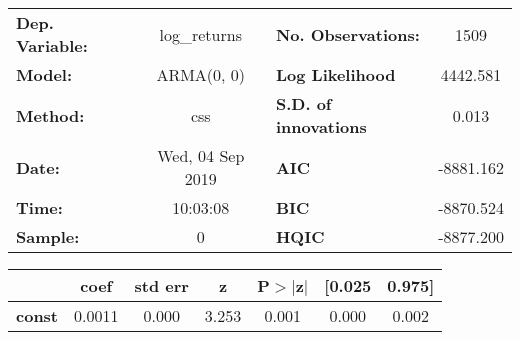\begin{center}
\begin{tabular}{lclc}
\toprule
\textbf{Dep. Variable:} &   log\_returns   & \textbf{  No. Observations:  } &    1509     \\
\textbf{Model:}         &    ARMA(0, 0)    & \textbf{  Log Likelihood     } &  4442.581   \\
\textbf{Method:}        &       css        & \textbf{  S.D. of innovations} &   0.013     \\
\textbf{Date:}          & Wed, 04 Sep 2019 & \textbf{  AIC                } & -8881.162   \\
\textbf{Time:}          &     10:03:08     & \textbf{  BIC                } & -8870.524   \\
\textbf{Sample:}        &        0         & \textbf{  HQIC               } & -8877.200   \\
\bottomrule
\end{tabular}
\vspace{1ex}
\begin{tabular}{lcccccc}
               & \textbf{coef} & \textbf{std err} & \textbf{z} & \textbf{P$> |$z$|$} & \textbf{[0.025} & \textbf{0.975]}  \\
\midrule
\textbf{const} &       0.0011  &        0.000     &     3.253  &         0.001        &        0.000    &        0.002     \\
\bottomrule
\end{tabular}
\end{center}
